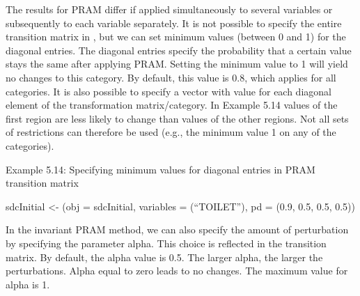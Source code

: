 \documentclass[letterpaper,10pt,english]{sphinxmanual}
\begin{document}
\begin{DUlineblock}{0em}
\item[] 
\item[] \sphinxcode{\sphinxupquote{\#\# - - - - - - - - - - -}}
\item[] 
\end{DUlineblock}

The results for PRAM differ if applied simultaneously to several
variables or subsequently to each variable separately. It is not
possible to specify the entire transition matrix in , but we
can set minimum values (between 0 and 1) for the diagonal entries. The
diagonal entries specify the probability that a certain value stays the
same after applying PRAM. Setting the minimum value to 1 will yield no
changes to this category. By default, this value is 0.8, which applies
for all categories. It is also possible to specify a vector with value
for each diagonal element of the transformation matrix/category. In
Example 5.14 values of the first region are less likely to change than
values of the other regions.  Not all sets of
restrictions can therefore be used (e.g., the minimum value 1 on any of
the categories).

Example 5.14: Specifying minimum values for diagonal entries in PRAM
transition matrix

sdcInitial \textless{}- (obj = sdcInitial, variables =
(“TOILET”), pd = (0.9, 0.5, 0.5, 0.5))

\begin{DUlineblock}{0em}
\item[] 
\item[] \sphinxcode{\sphinxupquote{\#\# - - - - - - - - - - -}}
\item[] 
\end{DUlineblock}

In the invariant PRAM method, we can also specify the amount of
perturbation by specifying the parameter alpha. This choice is reflected
in the transition matrix. By default, the alpha value is 0.5. The larger
alpha, the larger the perturbations. Alpha equal to zero leads to no
changes. The maximum value for alpha is 1.
\end{document}
